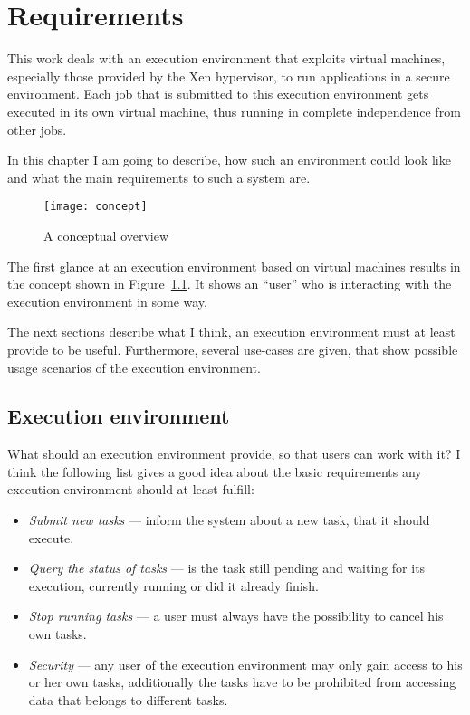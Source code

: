 
\chapter{Requirements}
\label{cha:requirements}

This  work  deals with  an  execution  environment  that exploits  virtual
machines,  especially  those  provided  by  the  Xen  hypervisor,  to  run
applications in a  secure environment. Each job that  is submitted to this
execution  environment gets  executed  in its  own  virtual machine,  thus
running in complete independence from other jobs.

In this chapter I am going to describe, how such an environment could look
like and what the main requirements to such a system are.

\begin{figure}[htbp]
  \centering
  \texttt{[image: concept]}
  \caption[Conceptual overview]{A conceptual overview}
  \label{fig:concept}
\end{figure}

The first  glance at  an execution environment  based on  virtual machines
results  in the concept  shown in  Figure~\ref{fig:concept}.  It  shows an
``user'' who is interacting with the execution environment in some way.

\medskip

The next sections describe what  I think, an execution environment must at
least provide to be useful. Furthermore, several use-cases are given, that
show possible usage scenarios of the execution environment.

\section{Execution environment}
\label{sec:req-execution-environment}

What should an execution environment  provide, so that users can work with
it?   I  think the  following  list  gives a  good  idea  about the  basic
requirements any execution environment should at least fulfill:

\begin{itemize}
\item \emph{Submit new tasks} --- \ie inform the system about a new task,
  that it should execute.
\item \emph{Query the status of  tasks} --- \ie is the task still pending
  and  waiting for  its execution,  currently  running or  did it  already
  finish.
\item \emph{Stop running tasks} --- \ie a user must always have the
  possibility to cancel his own tasks.
\item \emph{Security}  --- \ie any user of the  execution environment may
  only gain access to his or her own tasks, additionally the tasks have to
  be prohibited from accessing data that belongs to different tasks.
\end{itemize}

